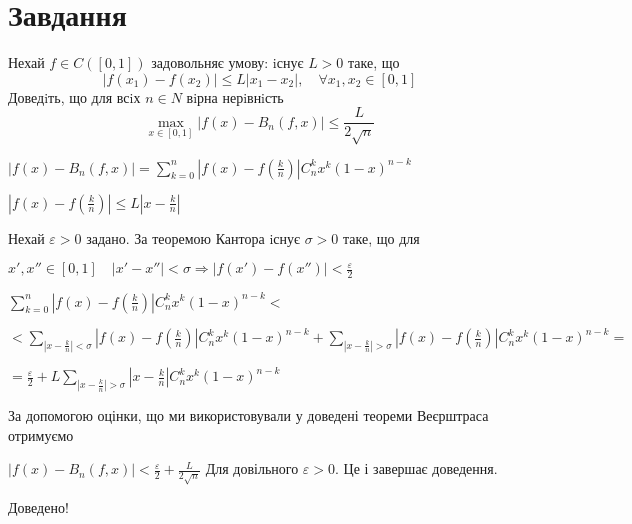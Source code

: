 

\chapter{Завдання \theHchapter}

\begin{tcolorbox}[title=Завдання]
    Нехай $f \in C([0, 1])$ задовольняє умову: iснує $L > 0$ таке, що
    $$ |f(x_1) - f(x_2)| \le L|x_1 - x_2|, 
    \quad \forall x_1,x_2 \in [0, 1] $$
    Доведiть, що для всiх $n \in N$ вiрна нерiвнiсть
    $$ \max\limits_{x\in [0, 1]} |f(x) - B_n(f, x)| 
    \le \frac{L}{2\sqrt{n}} $$
\end{tcolorbox}



$|f(x) - B_n(f,x)|=
\sum\limits_{k=0}^{n}|f(x) - f(\frac{k}{n})|C_n^kx^k(1-x)^{n-k}$


$|f(x) - f(\frac{k}{n})| \le L |x - \frac{k}{n}|$


Нехай $\varepsilon > 0$ задано. 
За теоремою Кантора iснує $\sigma > 0$ таке, що для


$x', x'' \in [0, 1] \quad |x' - x''| < \sigma \Rightarrow 
|f(x') - f(x'')| < \frac{\varepsilon}{2}$


$\sum\limits_{k=0}^{n}|f(x) - f(\frac{k}{n})|C_n^kx^k(1-x)^{n-k} < $


$<\sum\limits_{|x - \frac{k}{n}|<\sigma}
|f(x) - f(\frac{k}{n})|C_n^kx^k(1-x)^{n-k} + 
\sum\limits_{|x - \frac{k}{n}|>\sigma}
|f(x) - f(\frac{k}{n})|C_n^kx^k(1-x)^{n-k} =$



$= \frac{\varepsilon}{2} + 
L\sum\limits_{|x - \frac{k}{n}|>\sigma}
|x - \frac{k}{n}|C_n^kx^k(1-x)^{n-k}$


За допомогою оцінки, що ми використовували у доведені теореми Веєрштраса 
отримуємо


$|f(x) - B_n(f, x)| < \frac{\varepsilon}{2} + \frac{L}{2\sqrt{n}}$
Для довільного $\varepsilon > 0$. Це і завершає доведення.


Доведено!


